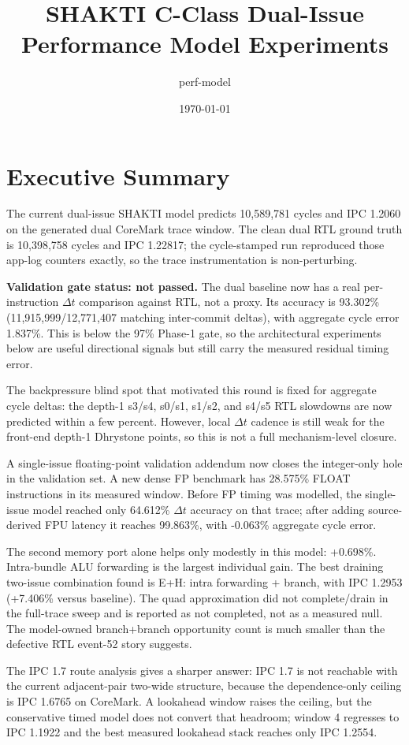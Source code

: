 \documentclass[10pt]{article}
\title{SHAKTI C-Class Dual-Issue Performance Model Experiments}
\author{perf-model}
\date{\today}
\begin{document}
\maketitle

\section*{Executive Summary}

The current dual-issue SHAKTI model predicts 10,589,781
cycles and IPC 1.2060 on the generated dual CoreMark
trace window. The clean dual RTL ground truth is 10,398,758
cycles and IPC 1.22817; the cycle-stamped run reproduced
those app-log counters exactly, so the trace instrumentation is non-perturbing.

\textbf{Validation gate status: not passed.} The dual baseline now has a real
per-instruction $\Delta t$ comparison against RTL, not a proxy. Its accuracy is
93.302\%
(11,915,999/12,771,407
matching inter-commit deltas), with aggregate cycle error
1.837\%. This is below the 97\%
Phase-1 gate, so the architectural experiments below are useful directional
signals but still carry the measured residual timing error.

The backpressure blind spot that motivated this round is fixed for aggregate
cycle deltas: the depth-1 s3/s4, s0/s1, s1/s2, and s4/s5 RTL slowdowns are now
predicted within a few percent. However, local $\Delta t$ cadence is still weak
for the front-end depth-1 Dhrystone points, so this is not a full mechanism-level
closure.

A single-issue floating-point validation addendum now closes the integer-only
hole in the validation set. A new dense FP benchmark has 28.575\% FLOAT
instructions in its measured window. Before FP timing was modelled, the
single-issue model reached only 64.612\% $\Delta t$ accuracy on that trace; after
adding source-derived FPU latency it reaches 99.863\%, with -0.063\% aggregate
cycle error.

The second memory port alone helps only modestly in this model:
+0.698\%. Intra-bundle ALU forwarding is
the largest individual gain. The best draining two-issue combination found is
E+H: intra forwarding + branch, with IPC 1.2953
(+7.406\%
versus baseline). The quad approximation did not complete/drain in the full-trace sweep and is reported as not completed, not as a measured null. The model-owned branch+branch
opportunity count is much smaller than the defective RTL event-52 story suggests.

The IPC 1.7 route analysis gives a sharper answer: IPC 1.7 is not reachable
with the current adjacent-pair two-wide structure, because the dependence-only
ceiling is IPC 1.6765 on CoreMark. A lookahead window raises the ceiling, but
the conservative timed model does not convert that headroom; window 4 regresses
to IPC 1.1922 and the best measured lookahead stack reaches only IPC 1.2554.
\end{document}
